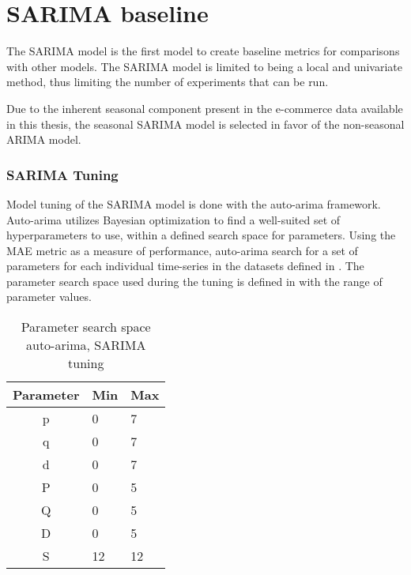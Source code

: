 
\section{SARIMA baseline}
\label{section:Method:SARIMA}

The SARIMA model is the first model to create baseline metrics for comparisons with other models.
The SARIMA model is limited to being a local and univariate method,
thus limiting the number of experiments that can be run.

Due to the inherent seasonal component present in the e-commerce data available in this thesis,
the seasonal SARIMA model is selected in favor of the non-seasonal ARIMA model.

\subsubsection{SARIMA Tuning}
Model tuning of the SARIMA model is done with the auto-arima framework.
Auto-arima utilizes Bayesian optimization to find a well-suited set of hyperparameters to use,
within a defined search space for parameters.
Using the MAE metric as a measure of performance, auto-arima search for a set of parameters for each individual time-series
in the datasets defined in .
The parameter search space used during the tuning is defined in  with the range of parameter values.

\begin{table}[h]
  \centering
  \caption{Parameter search space auto-arima, SARIMA tuning}
  \label{table:method:arima-tuning}
  \begin{tabular}{|c|l|l|}\hline
    Parameter & Min & Max \\ \hline
    p         & 0   & 7   \\ \hline
    q         & 0   & 7   \\ \hline
    d         & 0   & 7   \\ \hline
    P         & 0   & 5   \\ \hline
    Q         & 0   & 5   \\ \hline
    D         & 0   & 5   \\ \hline
    S         & 12  & 12  \\ \hline
  \end{tabular}
\end{table}









